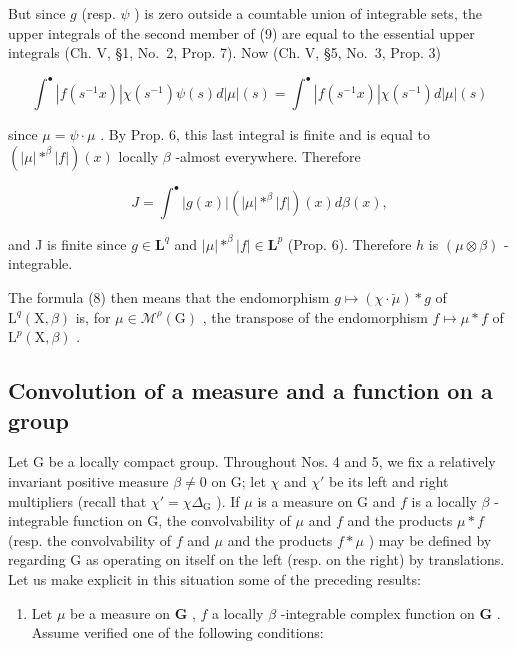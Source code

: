But since \(g\) (resp. \(\psi\) ) is zero outside a countable union of integrable sets, the upper integrals of the second member of (9) are equal to the essential upper integrals (Ch. V, §1, No.~2, Prop. 7). Now (Ch. V, §5, No.~3, Prop. 3)

\[
\int^ {\bullet} | f (s ^ {- 1} x) | \chi (s ^ {- 1}) \psi (s) d | \mu | (s) = \int^ {\bullet} | f (s ^ {- 1} x) | \chi (s ^ {- 1}) d | \mu | (s)
\]

since \(\mu = \psi \cdot \mu\) . By Prop. 6, this last integral is finite and is equal to \((|\mu| *^{\beta} |f|)(x)\) locally \(\beta\) -almost everywhere. Therefore

\[
J = \int^ {\bullet} | g (x) | \left(| \mu | * ^ {\beta} | f |\right) (x) d \beta (x),
\]

and J is finite since \(g \in \mathbf{L}^q\) and \(|\mu| *^\beta |f| \in \mathbf{L}^p\) (Prop. 6). Therefore \(h\) is \((\mu \otimes \beta)\) -integrable.

The formula (8) then means that the endomorphism \(g \mapsto (\chi \cdot \breve{\mu}) * g\) of \(\mathrm{L}^q(\mathrm{X},\beta)\) is, for \(\mu \in \mathcal{M}^\rho(\mathrm{G})\) , the transpose of the endomorphism \(f \mapsto \mu * f\) of \(\mathrm{L}^p(\mathrm{X},\beta)\) .

\subsection{Convolution of a measure and a function on a group}

Let G be a locally compact group. Throughout Nos. 4 and 5, we fix a relatively invariant positive measure \(\beta \neq 0\) on G; let \(\chi\) and \(\chi'\) be its left and right multipliers (recall that \(\chi' = \chi \Delta_{\mathrm{G}}\) ). If \(\mu\) is a measure on G and \(f\) is a locally \(\beta\) -integrable function on G, the convolvability of \(\mu\) and \(f\) and the products \(\mu * f\) (resp. the convolvability of \(f\) and \(\mu\) and the products \(f * \mu\) ) may be defined by regarding G as operating on itself on the left (resp. on the right) by translations. Let us make explicit in this situation some of the preceding results:

\begin{enumerate}
\def\labelenumi{\arabic{enumi})}
\tightlist
\item
  Let \(\mu\) be a measure on \(\mathbf{G}\) , \(f\) a locally \(\beta\) -integrable complex function on \(\mathbf{G}\) . Assume verified one of the following conditions:
\end{enumerate}

